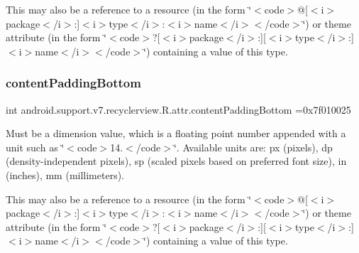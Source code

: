 This may also be a reference to a resource (in the form \char`\"{}$<$code$>$@\mbox{[}$<$i$>$package$<$/i$>$\+:\mbox{]}$<$i$>$type$<$/i$>$\+:$<$i$>$name$<$/i$>$$<$/code$>$\char`\"{}) or theme attribute (in the form \char`\"{}$<$code$>$?\mbox{[}$<$i$>$package$<$/i$>$\+:\mbox{]}\mbox{[}$<$i$>$type$<$/i$>$\+:\mbox{]}$<$i$>$name$<$/i$>$$<$/code$>$\char`\"{}) containing a value of this type. \mbox{\label{classandroid_1_1support_1_1v7_1_1recyclerview_1_1R_1_1attr_a2194e3c487011b405bf6f88be71c0119}} 
\subsubsection{\texorpdfstring{content\+Padding\+Bottom}{contentPaddingBottom}}
{\footnotesize\ttfamily int android.\+support.\+v7.\+recyclerview.\+R.\+attr.\+content\+Padding\+Bottom =0x7f010025\hspace{0.3cm}{\ttfamily [static]}}

Must be a dimension value, which is a floating point number appended with a unit such as \char`\"{}$<$code$>$14.\+5sp$<$/code$>$\char`\"{}. Available units are\+: px (pixels), dp (density-\/independent pixels), sp (scaled pixels based on preferred font size), in (inches), mm (millimeters). 

This may also be a reference to a resource (in the form \char`\"{}$<$code$>$@\mbox{[}$<$i$>$package$<$/i$>$\+:\mbox{]}$<$i$>$type$<$/i$>$\+:$<$i$>$name$<$/i$>$$<$/code$>$\char`\"{}) or theme attribute (in the form \char`\"{}$<$code$>$?\mbox{[}$<$i$>$package$<$/i$>$\+:\mbox{]}\mbox{[}$<$i$>$type$<$/i$>$\+:\mbox{]}$<$i$>$name$<$/i$>$$<$/code$>$\char`\"{}) containing a value of this type. \mbox{\label{classandroid_1_1support_1_1v7_1_1recyclerview_1_1R_1_1attr_a6e40ff5a431c75e53d28f9aa45683fc9}} 
